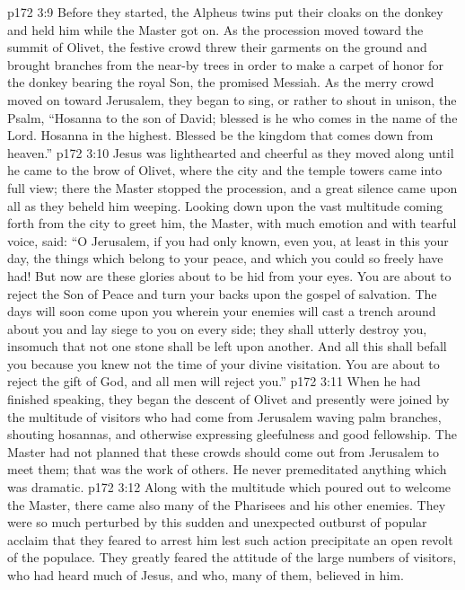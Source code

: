 \vs p172 3:9 Before they started, the Alpheus twins put their cloaks on the donkey and held him while the Master got on. As the procession moved toward the summit of Olivet, the festive crowd threw their garments on the ground and brought branches from the near\hyp{}by trees in order to make a carpet of honor for the donkey bearing the royal Son, the promised Messiah. As the merry crowd moved on toward Jerusalem, they began to sing, or rather to shout in unison, the Psalm, “Hosanna to the son of David; blessed is he who comes in the name of the Lord. Hosanna in the highest. Blessed be the kingdom that comes down from heaven.”
\vs p172 3:10 Jesus was lighthearted and cheerful as they moved along until he came to the brow of Olivet, where the city and the temple towers came into full view; there the Master stopped the procession, and a great silence came upon all as they beheld him weeping. Looking down upon the vast multitude coming forth from the city to greet him, the Master, with much emotion and with tearful voice, said: \textcolor{ubdarkred}{“O Jerusalem, if you had only known, even you, at least in this your day, the things which belong to your peace, and which you could so freely have had! But now are these glories about to be hid from your eyes. You are about to reject the Son of Peace and turn your backs upon the gospel of salvation. The days will soon come upon you wherein your enemies will cast a trench around about you and lay siege to you on every side; they shall utterly destroy you, insomuch that not one stone shall be left upon another. And all this shall befall you because you knew not the time of your divine visitation. You are about to reject the gift of God, and all men will reject you.”}
\vs p172 3:11 When he had finished speaking, they began the descent of Olivet and presently were joined by the multitude of visitors who had come from Jerusalem waving palm branches, shouting hosannas, and otherwise expressing gleefulness and good fellowship. The Master had not planned that these crowds should come out from Jerusalem to meet them; that was the work of others. He never premeditated anything which was dramatic.
\vs p172 3:12 Along with the multitude which poured out to welcome the Master, there came also many of the Pharisees and his other enemies. They were so much perturbed by this sudden and unexpected outburst of popular acclaim that they feared to arrest him lest such action precipitate an open revolt of the populace. They greatly feared the attitude of the large numbers of visitors, who had heard much of Jesus, and who, many of them, believed in him.

